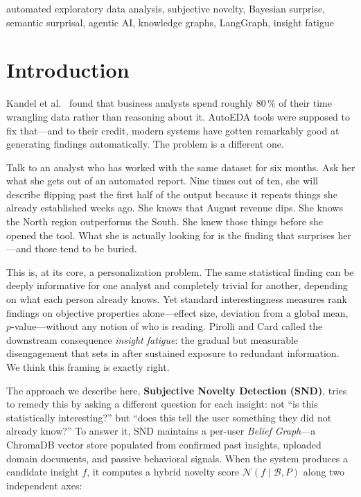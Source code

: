 \documentclass[conference]{IEEEtran}
\begin{document}
\begin{IEEEkeywords}
automated exploratory data analysis, subjective novelty, Bayesian surprise,
semantic surprisal, agentic AI, knowledge graphs, LangGraph, insight fatigue
\end{IEEEkeywords}

\section{Introduction}
\label{sec:intro}

Kandel et al.\ \cite{kandel2012enterprise} found that business analysts
spend roughly 80\,\% of their time wrangling data rather than reasoning
about it. AutoEDA tools were supposed to fix that---and to their credit,
modern systems have gotten remarkably good at generating findings
automatically. The problem is a different one.

Talk to an analyst who has worked with the same dataset for six months.
Ask her what she gets out of an automated report. Nine times out of ten,
she will describe flipping past the first half of the output because it
repeats things she already established weeks ago. She knows that August
revenue dips. She knows the North region outperforms the South. She
knew those things before she opened the tool. What she is actually
looking for is the finding that surprises her---and those tend to be
buried.

This is, at its core, a personalization problem. The same statistical
finding can be deeply informative for one analyst and completely
trivial for another, depending on what each person already knows.
Yet standard interestingness measures \cite{geng2006interestingness}
rank findings on objective properties alone---effect size, deviation
from a global mean, $p$-value---without any notion of who is reading.
Pirolli and Card \cite{pirolli2005sensemaking} called the downstream
consequence \emph{insight fatigue}: the gradual but measurable
disengagement that sets in after sustained exposure to redundant
information. We think this framing is exactly right.

The approach we describe here, \textbf{Subjective Novelty Detection
(SND)}, tries to remedy this by asking a different question for each
insight: not ``is this statistically interesting?'' but ``does this
tell the user something they did not already know?'' To answer it, SND
maintains a per-user \emph{Belief Graph}---a ChromaDB vector store
populated from confirmed past insights, uploaded domain documents, and
passive behavioral signals. When the system produces a candidate insight
$f$, it computes a hybrid novelty score $\mathcal{N}(f \mid \mathcal{B},
P)$ along two independent axes:
\end{document}
